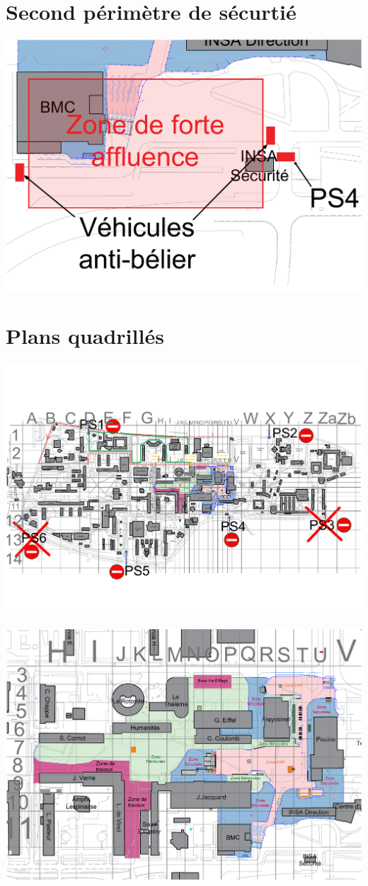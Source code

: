 \documentclass[hidelinks, paper=a4, fontsize=13pt]{report}
\begin{document}
\section{Second périmètre de sécurtié}
	\begin{center}\includegraphics[width=.95\textheight, angle=90]{Exports/Plan_24h_45eme-Vehicules_beliers}\end{center}

\section{Plans quadrillés}
	\begin{center}\includegraphics[width=.95\textheight, angle=90]{Exports/Plan_24h_45eme-Quadrillage_campus}\end{center}
	\begin{center}\includegraphics[width=.95\textheight, angle=90]{Exports/Plan_24h_45eme-Quadrillage_zoom}\end{center}
\end{document}
